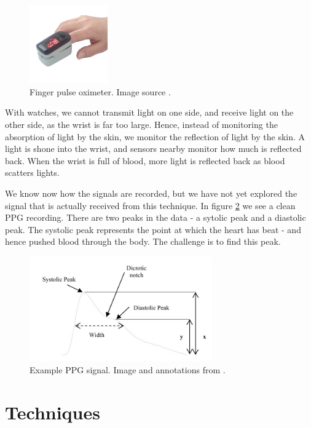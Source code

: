 \documentclass[12pt,a4paper,twoside,openright]{report}
\begin{document}
\begin{figure}[h!]
	\centerline{\includegraphics[width=0.3\textwidth]{figs/fingerppg.jpg}}
	\caption{Finger pulse oximeter. Image source \cite{wiki:fingerppg}.}
\label{fig:fingerppg}
\end{figure}

With watches, we cannot transmit light on one side, and
receive light on the other side, as the wrist is far too large. Hence, instead
of monitoring the absorption of light by the skin, we monitor the reflection
of light by the skin. A light is shone into the wrist, and sensors nearby
monitor how much is reflected back. When the wrist is full of blood, more
light is reflected back as blood scatters lights.

We know now how the signals are recorded, but we have not yet explored the
signal that is actually received from this technique. In figure
\ref{fig:typicalppgsignal} we see a
clean PPG recording. There are two peaks in the data - a sytolic peak and a
diastolic peak. The systolic peak represents the point at which the heart has
beat - and hence pushed blood through the body. The challenge is to find this
peak.

\begin{figure}[h!]
	\centerline{\includegraphics[width=0.7\textwidth]{figs/typicalppgsignal.jpeg}}
	\caption{Example PPG signal. Image and annotations from \cite{elgendi12}.}
\label{fig:typicalppgsignal}
\end{figure}

\section{Techniques}
\end{document}
